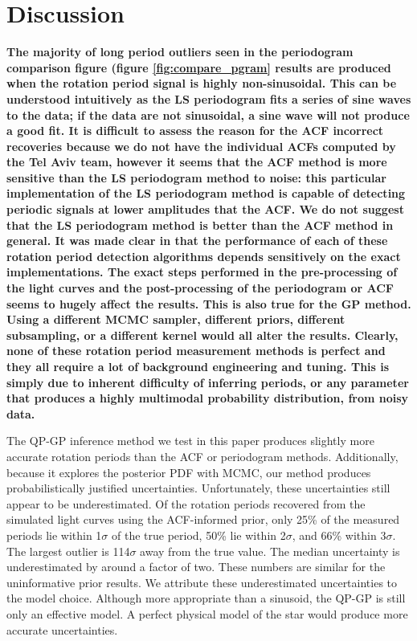 \documentclass[a4paper,fleqn,usenatbib,useAMS]{mnras}
\newcommand{\tdmcomment}[1]{{\color{blue}#1}}
\begin{document}
\section{Discussion}
\label{sec:discussion}

{\bf The majority of long period outliers seen in the periodogram comparison
figure (figure \ref{fig:compare_pgram} results are produced when the rotation
period signal is highly non-sinusoidal.
This can be understood intuitively as the LS periodogram fits a series of sine
waves to the data; if the data are not sinusoidal, a sine wave will not
produce a good fit.
It is difficult to assess the reason for the ACF incorrect recoveries because
we do not have the individual ACFs computed by the \citet{Aigrain2015} Tel
Aviv team, however it seems that the ACF method is more sensitive than the LS
periodogram method to noise: this particular implementation of the LS
periodogram method is capable of detecting periodic signals at lower
amplitudes that the ACF.
We do not suggest that the LS periodogram method is better than the ACF method
in general.
It was made clear in \citet{Aigrain2015} that the performance of each of these
rotation period detection algorithms depends sensitively on the exact
implementations.
The exact steps performed in the pre-processing of the light curves and the
post-processing of the periodogram or ACF seems to hugely affect the results.
This is also true for the GP method.
Using a different MCMC sampler, different priors, different subsampling, or a
different kernel would all alter the results.
Clearly, none of these rotation period measurement methods is perfect and they
all require a lot of background engineering and tuning.
This is simply due to inherent difficulty of inferring periods, or any
parameter that produces a highly multimodal probability distribution, from
noisy data.}

The QP-GP inference method we test in this paper produces slightly more
accurate rotation periods than the ACF or periodogram methods.
Additionally, because it explores the posterior PDF with MCMC, our method
produces probabilistically justified uncertainties.
Unfortunately, these uncertainties still appear to be underestimated.
Of the rotation periods recovered from the simulated light curves using the
ACF-informed prior, only 25\% of the measured periods lie within 1$\sigma$ of
the true period, 50\% lie within 2$\sigma$, and 66\% within 3$\sigma$.
The largest outlier is 114$\sigma$ away from the true value.
The median uncertainty is underestimated by around a factor of two.
These numbers are similar for the uninformative prior results.
We attribute these underestimated uncertainties to the model choice.
Although more appropriate than a sinusoid, the QP-GP is still only an
 effective model.
A perfect physical model of the star would produce more accurate
uncertainties.
\end{document}
